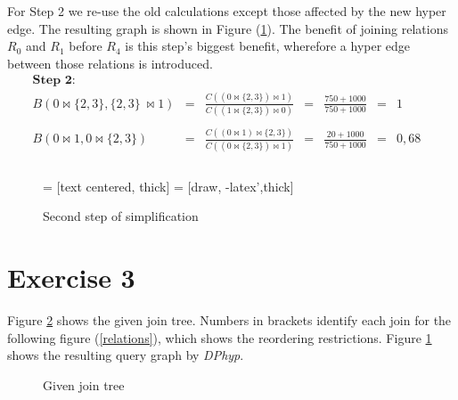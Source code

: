 \documentclass[paper=a4, fontsize=11pt]{scrartcl} %
\numberwithin{equation}{section} %
\numberwithin{figure}{section} %
\numberwithin{table}{section} %
\def\ojoin{\setbox0=\hbox{$\Join$}%
  \rule[+0.095ex]{.3em}{.5pt}\llap{\rule[1.35ex]{0.3em}{0.5pt}}}
\def\rightouterjoin{\mathbin{\Join\mkern-5.8mu\ojoin}}
\begin{document}
For Step 2 we re-use the old calculations except those affected by the new hyper edge. The resulting graph is shown in Figure (\ref{simpl2}). The benefit of joining relations $R_0$ and $R_1$ before $R_4$ is this step's biggest benefit, wherefore a hyper edge between those relations is introduced. 
\begin{align*}
\textbf{Step 2:} \\
B(0 \Join \{2,3\}, \{2,3\}\ \Join 1) &= &\frac{C((0 \Join \{2,3\}) \Join 1)}{C((1 \Join \{2,3\}) \Join 0)}& =& \frac{750+1000}{750+1000} &=& 1& \\ \\
B(0 \Join 1, 0 \Join \{2,3\}) &= &\frac{C((0 \Join 1) \Join \{2,3\})}{C((0 \Join \{2,3\}) \Join 1)}& =& \frac{20+1000}{750+1000} &=& 0,68&\\ \\
\end{align*}

\begin{figure}[H]
	\centering
		 = [text centered, thick]
		 = [draw, -latex',thick]  

	\caption{Second step of simplification}
	  \label{simpl2}
\end{figure}

\section{Exercise 3}
Figure \ref{jtree} shows the given join tree. Numbers in brackets identify each join for the following figure (\ref{relations}), which shows the reordering restrictions. Figure \ref{simpl2} shows the resulting query graph by \textit{DPhyp}. 
\begin{figure}[H]
\centering
\caption{Given join tree}
  \label{jtree}
\end{figure}
\end{document}
